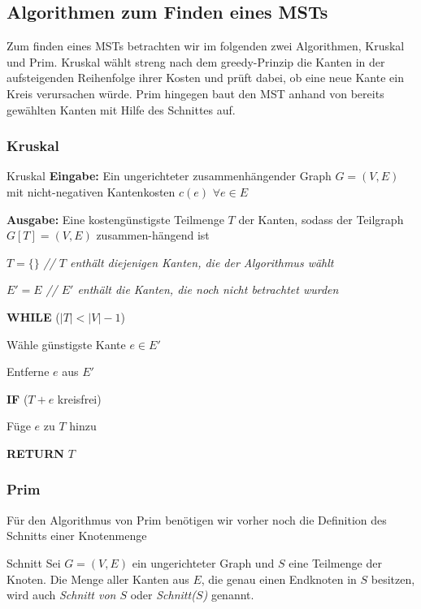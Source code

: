 \documentclass{panikzettel}
\newcommand\tab[1][1cm]{\hspace*{#1}}
\newcommand{\boxspace}{	\vspace{-\baselineskip}	}
\begin{document}
{

\subsection{Algorithmen zum Finden eines MSTs}

Zum finden eines MSTs betrachten wir im folgenden zwei Algorithmen, Kruskal und Prim. Kruskal wählt streng nach dem greedy-Prinzip die Kanten in der aufsteigenden Reihenfolge ihrer Kosten und prüft dabei, ob eine neue Kante ein Kreis verursachen würde. Prim hingegen baut den MST anhand von bereits gewählten Kanten mit Hilfe des Schnittes auf.

\subsubsection{Kruskal}

\begin{algo}{Kruskal}
	\textbf{Eingabe:} Ein ungerichteter zusammenhängender Graph $G = (V,E)$ mit nicht-negativen Kantenkosten $c(e)$ $\forall e \in E$
	
	\textbf{Ausgabe:} Eine kostengünstigste Teilmenge $T$ der Kanten, sodass der Teilgraph $G[T] = (V,E)$ zusammen-hängend ist
	
	\tcblower
	
	$T = \{ \}$ \textit{ \color{gray} // $T$ enthält diejenigen Kanten, die der Algorithmus wählt }
	
	$E' = E$ \textit{ \color{gray} // $E'$ enthält die Kanten, die noch nicht betrachtet wurden }
	
	\textbf{WHILE} ($|T| < |V| - 1$)
	
	\tab Wähle günstigste Kante $e \in E'$
	
	\tab Entferne $e$ aus $E'$
	
	\tab \textbf{IF} ($T+e$ kreisfrei)
	
	\tab\tab Füge $e$ zu $T$ hinzu
		
	\textbf{RETURN} $T$
\end{algo}

\subsubsection{Prim}

Für den Algorithmus von Prim benötigen wir vorher noch die Definition des Schnitts einer Knotenmenge

\begin{halfboxl}
	\boxspace
\begin{defi}{Schnitt}
	Sei $G=(V,E)$ ein ungerichteter Graph und $S$ eine Teilmenge der Knoten. Die Menge aller Kanten aus $E$, die genau einen Endknoten in $S$ besitzen, wird auch \emph{Schnitt von $S$} oder \emph{Schnitt($S$)} genannt.
\end{defi}


\end{halfboxl}}
\end{document}
